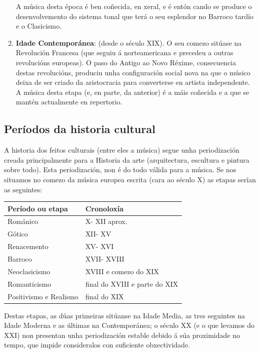 \documentclass[a4paper, twoside]{templates/ociamthesis}
\begin{document}
\begin{enumerate}
  A música desta época é ben coñecida, en xeral, e é entón cando se produce o desenvolvemento do sistema tonal que terá o seu esplendor no Barroco tardío e o Clasicismo.
\item
  \textbf{Idade Contemporánea}:
  (desde o século XIX). O seu comezo sitúase na Revolución Francesa (que seguiu á norteamericana e precedeu a outras revolucións europeas). O paso do Antigo ao Novo Réxime, consecuencia destas revolucións, produciu unha configuración social nova na que o músico deixa de ser criado da aristocracia para converterse en artista independente.\\
  A música desta etapa (e, en parte, da anterior) é a máis coñecida e a que se mantén actualmente en repertorio.
\end{enumerate}

\hypertarget{peruxedodos-da-historia-cultural}{%
\subsection*{Períodos da historia cultural}\label{peruxedodos-da-historia-cultural}}

A historia dos feitos culturais (entre eles a música) segue unha periodización creada principalmente para a Historia da arte (arquitectura, escultura e pintura sobre todo). Esta periodización, non é do todo válida para a música. Se nos situamos no comezo da música europea escrita (cara ao século X) as etapas serían as seguintes:

\begin{longtable}[]{@{}ll@{}}
\toprule()
Período ou etapa & Cronoloxía \\
\midrule()
\endhead
Románico & X- XII aprox. \\
Gótico & XII- XV \\
Renacemento & XV- XVI \\
Barroco & XVII- XVIII \\
Neoclasicismo & XVIII e comezo do XIX \\
Romanticismo & final do XVIII e parte do XIX \\
Positivismo e Realismo & final do XIX \\
\bottomrule()
\end{longtable}

Destas etapas, as dúas primeiras sitúanse na Idade Media, as tres seguintes na Idade Moderna e as últimas na Contemporánea; o século XX (e o que levamos do XXI) non presentan unha periodización estable debido á súa proximidade no tempo, que impide consideralos con suficiente obxectividade.
\end{document}
